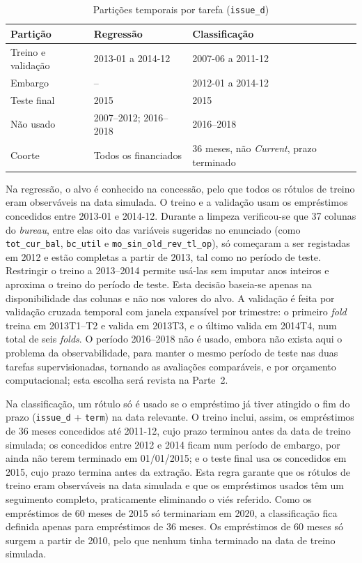 \begin{table}[!t]
\caption{Partições temporais por tarefa (\texttt{issue\_d})}
\label{tab:split}
\centering
\footnotesize
\begin{tabular}{|p{}|p{}|p{}|}
\hline
\textbf{Partição} & \textbf{Regressão} & \textbf{Classificação} \\
\hline
Treino e validação & 2013-01 a 2014-12 & 2007-06 a 2011-12 \\
\hline
Embargo & -- & 2012-01 a 2014-12 \\
\hline
Teste final & 2015 & 2015 \\
\hline
Não usado & 2007--2012; 2016--2018 & 2016--2018 \\
\hline
Coorte & Todos os financiados & 36 meses, não \textit{Current}, prazo terminado \\
\hline
\end{tabular}
\end{table}

Na regressão, o alvo é conhecido na concessão, pelo que todos os rótulos de treino eram observáveis na data simulada. O treino e a validação usam os empréstimos concedidos entre 2013-01 e 2014-12. Durante a limpeza verificou-se que 37 colunas do \textit{bureau}, entre elas oito das variáveis sugeridas no enunciado (como \texttt{tot\_cur\_bal}, \texttt{bc\_util} e \texttt{mo\_sin\_old\_rev\_tl\_op}), só começaram a ser registadas em 2012 e estão completas a partir de 2013, tal como no período de teste. Restringir o treino a 2013--2014 permite usá-las sem imputar anos inteiros e aproxima o treino do período de teste. Esta decisão baseia-se apenas na disponibilidade das colunas e não nos valores do alvo. A validação é feita por validação cruzada temporal com janela expansível por trimestre: o primeiro \textit{fold} treina em 2013T1--T2 e valida em 2013T3, e o último valida em 2014T4, num total de seis \textit{folds}. O período 2016--2018 não é usado, embora não exista aqui o problema da observabilidade, para manter o mesmo período de teste nas duas tarefas supervisionadas, tornando as avaliações comparáveis, e por orçamento computacional; esta escolha será revista na Parte~2.

Na classificação, um rótulo só é usado se o empréstimo já tiver atingido o fim do prazo (\texttt{issue\_d} + \texttt{term}) na data relevante. O treino inclui, assim, os empréstimos de 36 meses concedidos até 2011-12, cujo prazo terminou antes da data de treino simulada; os concedidos entre 2012 e 2014 ficam num período de embargo, por ainda não terem terminado em 01/01/2015; e o teste final usa os concedidos em 2015, cujo prazo termina antes da extração. Esta regra garante que os rótulos de treino eram observáveis na data simulada e que os empréstimos usados têm um seguimento completo, praticamente eliminando o viés referido. Como os empréstimos de 60 meses de 2015 só terminariam em 2020, a classificação fica definida apenas para empréstimos de 36 meses. Os empréstimos de 60 meses só surgem a partir de 2010, pelo que nenhum tinha terminado na data de treino simulada.

